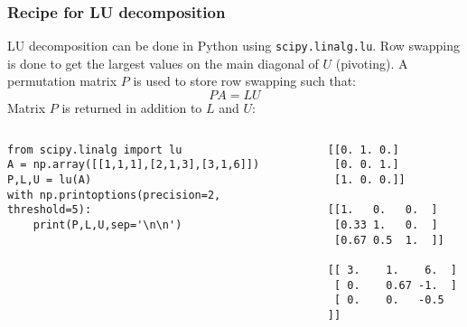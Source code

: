 \begin{frame}[fragile]
  \frametitle{Recipe for LU decomposition}
  LU decomposition can be done in Python using \lstinline|scipy.linalg.lu|. Row swapping is done to get the largest values on the main diagonal of $U$ (pivoting). A permutation matrix $P$ is used to store row swapping such that:
   \[
    PA = LU
   \]
   Matrix $P$ is returned in addition to $L$ and $U$:
  \begin{columns}[T]
      \begin{lstlisting}
from scipy.linalg import lu
A = np.array([[1,1,1],[2,1,3],[3,1,6]])
P,L,U = lu(A)
with np.printoptions(precision=2, threshold=5):
    print(P,L,U,sep='\n\n')
      \end{lstlisting}
      \begin{lstlisting}[style=PyOutput,keepspaces=true]
[[0. 1. 0.]
 [0. 0. 1.]
 [1. 0. 0.]]

[[1.   0.   0.  ]
 [0.33 1.   0.  ]
 [0.67 0.5  1.  ]]

[[ 3.    1.    6.  ]
 [ 0.    0.67 -1.  ]
 [ 0.    0.   -0.5 ]]
      \end{lstlisting}
  \end{columns}
\end{frame}


